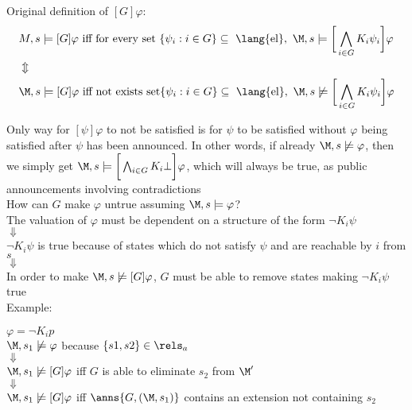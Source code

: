 Original definition of $[G]\varphi$:
\begin{align*}
	&M,s\models[G]\varphi \textrm { iff for every set } \{\psi_i : i \in G\} \subseteq \textrm{ \lang{el}},~ \M,s \models \bigg[\bigwedge_{i\in G}K_i\psi_i\bigg]\varphi\\
	&\Updownarrow\\
&\M,s \models [G]\varphi \textrm{ iff not exists set} \{\psi_i: i\in G\} \subseteq \textrm{ \lang{el}},~ \M,s\not\models \bigg[\bigwedge_{i\in G}K_i\psi_i\bigg]\varphi\\
\end{align*}

Only way for $[\psi]\varphi$ to not be satisfied is for $\psi$ to be satisfied without $\varphi$ being satisfied after $\psi$ has been announced. In other words, if already $\M,s\not\models\varphi$, then we simply get $\M,s\models\bigg[\bigwedge_{i\in G}K_i\bot\bigg]\varphi$, which will always be true, as public announcements involving contradictions  \\

How can $G$ make $\varphi$ untrue assuming $\M,s \models\varphi$? \\
The valuation of $\varphi$ must be dependent on a structure of the form $\neg K_i\psi$\\
$\Downarrow$\\
$\neg K_i\psi$  is true because of states which do not satisfy $\psi$ and are reachable by $i$ from $s$\\
$\Downarrow$\\
In order to make $\M,s\not\models [G]\varphi$, $G$ must be able to remove states making $\neg K_i\psi$ true\\

Example:

\begin{figure}[h]
	\centering
\end{figure}

$\varphi = \neg K_ip$\\
$\M,s_1 \not\models \varphi$ because $\{s1, s2\} \in \rels_a$\\
$\Downarrow$\\
$\M,s_1\not\models[G]\varphi$ iff $G$ is able to eliminate $s_2$ from $\M'$\\
$\Downarrow$\\
$\M,s_1\not\models[G]\varphi$ iff $\anns{G,(\M,s_1)}$ contains an extension not containing $s_2$\\\\

